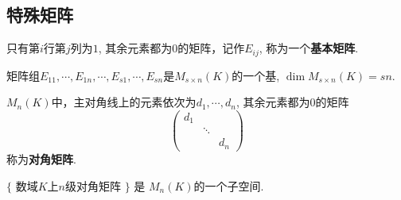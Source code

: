 \subsection{特殊矩阵}

\begin{Definition}[基本矩阵]
只有第$i$行第$j$列为$1$, 其余元素都为$0$的矩阵，记作$E_{ij}$, 称为一个\textbf{基本矩阵}. 
\end{Definition}

\begin{Note}
矩阵组$E_{11}, \cdots, E_{1n}, \cdots, E_{s1}, \cdots, E_{sn}$是$M_{s \times n}(K)$的一个基, $\dim M_{s \times n}(K) = sn$.
\end{Note}

\begin{Definition}[对角矩阵]
$M_n(K)$中，主对角线上的元素依次为$d_1, \cdots, d_n$, 其余元素都为$0$的矩阵
\[
\begin{pmatrix}
d_1 &   &    \\
    & \ddots & \\
    &        &d_n
\end{pmatrix} 
\]
称为\textbf{对角矩阵}.
\end{Definition}

\begin{Note}
$\{$ 数域$K$上$n$级对角矩阵 $\}$ 是 $M_n(K)$的一个子空间. 
\end{Note}


